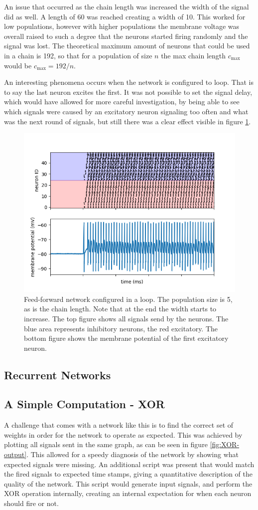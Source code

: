 \documentclass[10pt,a4paper]{article}
\begin{document}
An issue that occurred as the chain length was increased the width of the signal
did as well. A length of 60 was reached creating a width of 10. This worked for
low populations, however with higher populations the membrane voltage was
overall raised to such a degree that the neurons started firing randomly and the
signal was lost. The theoretical maximum amount of neurons that could be used in
a chain is 192, so that for a population of size $n$ the max chain length
$c_\text{max}$ would be $c_\text{max} = 192 / n$.

An interesting phenomena occurs when the network is configured to loop. That is
to say the last neuron excites the first. It was not possible to set the
signal delay, which would have allowed for more careful investigation, by being
able to see which signals were caused by an excitatory neuron signaling too
often and what was the next round of signals, but still there was a clear effect
visible in figure \ref{fig:feed-forward-loop}.

\begin{figure}
    \centering
    \includegraphics[width=.5\textwidth]{figures/feedforward-signals-loop.png}
    \caption{Feed-forward network configured in a loop. The population size is
        5, as is the chain length. Note that at the end the width starts to
        increase.  The top figure shows all signals send by the neurons. The
        blue area represents inhibitory neurons, the red excitatory. The bottom
        figure shows the membrane potential of the first excitatory neuron.}
    \label{fig:feed-forward-loop}
\end{figure}


\subsection{Recurrent Networks}

\subsection{A Simple Computation - XOR}
A challenge that comes with a network like this is to find the correct set of
weights in order for the network to operate as expected. This was achieved by
plotting all signals sent in the same graph, as can be seen in figure
\ref{fig:XOR-output}. This allowed for a speedy diagnosis of the network by
showing what expected signals were missing. An additional script was present
that would match the fired signals to expected time stamps, giving a
quantitative description of the quality of the network. This script would
generate input signals, and perform the XOR operation internally, creating an
internal expectation for when each neuron should fire or not.
\end{document}
